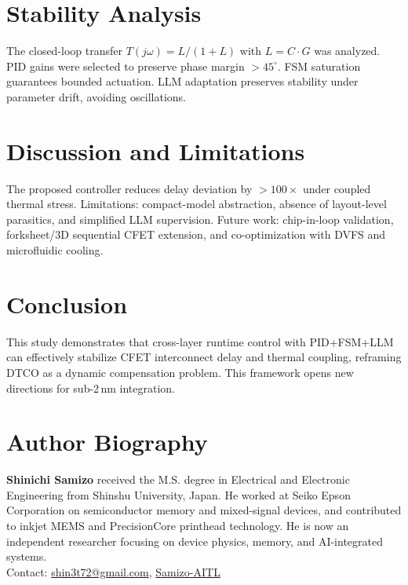 \documentclass[conference]{IEEEtran}
\begin{document}
\section{Stability Analysis}
The closed-loop transfer $T(j\omega)=L/(1+L)$ with $L=C\cdot G$ was analyzed. PID gains were selected to preserve phase margin $>45^\circ$. FSM saturation guarantees bounded actuation. LLM adaptation preserves stability under parameter drift, avoiding oscillations.

\section{Discussion and Limitations}
The proposed controller reduces delay deviation by $>100\times$ under coupled thermal stress. Limitations: compact-model abstraction, absence of layout-level parasitics, and simplified LLM supervision. Future work: chip-in-loop validation, forksheet/3D sequential CFET extension, and co-optimization with DVFS and microfluidic cooling.

\section{Conclusion}
This study demonstrates that cross-layer runtime control with PID+FSM+LLM can effectively stabilize CFET interconnect delay and thermal coupling, reframing DTCO as a dynamic compensation problem. This framework opens new directions for sub-2\,nm integration.




\section*{Author Biography}
\noindent\textbf{Shinichi Samizo} received the M.S. degree in Electrical and Electronic Engineering from Shinshu University, Japan. He worked at Seiko Epson Corporation on semiconductor memory and mixed-signal devices, and contributed to inkjet MEMS and PrecisionCore printhead technology. He is now an independent researcher focusing on device physics, memory, and AI-integrated systems.\\
Contact: \href{mailto:shin3t72@gmail.com}{shin3t72@gmail.com}, \href{https://github.com/Samizo-AITL}{Samizo-AITL}
\end{document}
